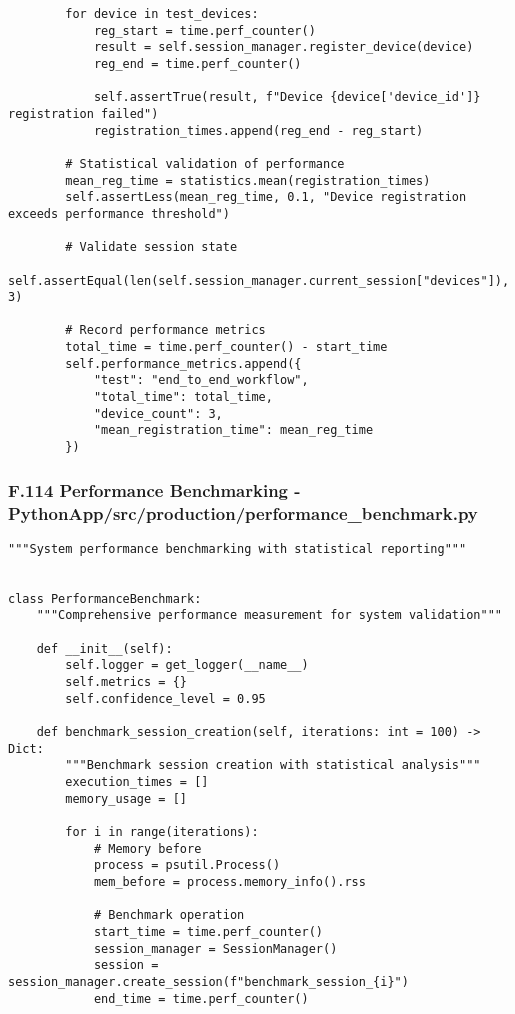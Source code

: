 \documentclass[12pt,a4paper]{report}
\begin{document}
{{\begin{verbatim}
        for device in test_devices:
            reg_start = time.perf_counter()
            result = self.session_manager.register_device(device)
            reg_end = time.perf_counter()

            self.assertTrue(result, f"Device {device['device_id']} registration failed")
            registration_times.append(reg_end - reg_start)

        # Statistical validation of performance
        mean_reg_time = statistics.mean(registration_times)
        self.assertLess(mean_reg_time, 0.1, "Device registration exceeds performance threshold")

        # Validate session state
        self.assertEqual(len(self.session_manager.current_session["devices"]), 3)

        # Record performance metrics
        total_time = time.perf_counter() - start_time
        self.performance_metrics.append({
            "test": "end_to_end_workflow",
            "total_time": total_time,
            "device_count": 3,
            "mean_registration_time": mean_reg_time
        })
\end{verbatim}

\subsubsection{F.114 Performance Benchmarking - PythonApp/src/production/performance_benchmark.py}

\begin{verbatim}
"""System performance benchmarking with statistical reporting"""


class PerformanceBenchmark:
    """Comprehensive performance measurement for system validation"""

    def __init__(self):
        self.logger = get_logger(__name__)
        self.metrics = {}
        self.confidence_level = 0.95

    def benchmark_session_creation(self, iterations: int = 100) -> Dict:
        """Benchmark session creation with statistical analysis"""
        execution_times = []
        memory_usage = []

        for i in range(iterations):
            # Memory before
            process = psutil.Process()
            mem_before = process.memory_info().rss

            # Benchmark operation
            start_time = time.perf_counter()
            session_manager = SessionManager()
            session = session_manager.create_session(f"benchmark_session_{i}")
            end_time = time.perf_counter()


\end{verbatim}}}
\end{document}
